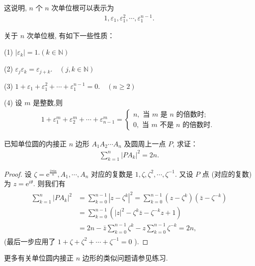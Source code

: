 这说明, $n$ 个 $n$ 次单位根可以表示为
\begin{align*}
	1, \varepsilon_1, \varepsilon_1^2, \cdots, \varepsilon_1^{n-1} .
\end{align*}

关于 $n$ 次单位根, 有如下一些性质：

(1) $\left|\varepsilon_k\right|=1 .(k \in \mathbb{N})$

(2) $\varepsilon_j \varepsilon_k=\varepsilon_{j+k} . \quad(j, k \in \mathbb{N})$

(3) $1+\varepsilon_1+\varepsilon_1^2+\cdots+\varepsilon_1^{n-1}=0 . \quad(n \geqslant 2)$

(4) 设 $m$ 是整数,则
\begin{align*}
	1+\varepsilon_1^m+\varepsilon_2^m+\cdots+\varepsilon_{n-1}^m=\left\{\begin{array}{l}
		                                                                    n, \text { 当 } m \text { 是 } n \text { 的倍数时; } \\
		                                                                    0, \text { 当 } m \text { 不是 } n \text { 的倍数时. }
	                                                                    \end{array}\right.
\end{align*}

\begin{example}\label{ex:已知单位圆的内接正 $n$ 边形}
	已知单位圆的内接正 $n$ 边形 $A_1 A_2 \cdots A_n$ 及圆周上一点 $P$, 求证：
	\begin{align*}
		\sum_{k=1}^n\left|P A_k\right|^2=2 n .
	\end{align*}
\end{example}

\begin{proof}
	设 $\zeta=\mathrm{e}^{\frac{2 \pi \mathrm{in}}{n}}, A_1, \cdots, A_n$ 对应的复数是 $1, \zeta, \zeta^2, \cdots, \zeta^{-1}$. 又设 $P$ 点 (对应的复数) 为 $z=\mathrm{e}^{i \theta}$. 则我们有
	\begin{align*}
		\begin{aligned}
			\sum_{k=1}^n\left|P A_k\right|^2 & =\sum_{k=0}^{n-1}\left|z-\zeta^k\right|^2=\sum_{k=0}^{n-1}\left(z-\zeta^k\right)\left(\bar{z}-\zeta^{-k}\right) \\
			                                 & =\sum_{k=0}^{n-1}\left(|z|^2-\zeta^k \bar{z}-\zeta^{-k} z+1\right)                                              \\
			                                 & =2 n-\bar{z} \sum_{k=0}^{n-1} \zeta^k-z \sum_{k=0}^{n-1} \zeta^{-k}=2 n,
		\end{aligned}
	\end{align*}
	(最后一步应用了 $1+\zeta+\zeta^2+\cdots+\zeta^{-1}=0$ ).
\end{proof}
\begin{note}
	更多有关单位圆内接正 $n$ 边形的类似问题请参见练习.
\end{note}

